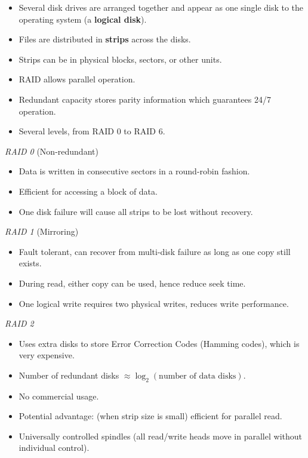 \begin{itemize}
    \item Several disk drives are arranged together and appear as one single disk to the operating
        system (a \textbf{logical disk}).
    \item Files are distributed in \textbf{strips} across the disks.
    \item Strips can be in physical blocks, sectors, or other units.
    \item RAID allows parallel operation.
    \item Redundant capacity stores parity information which guarantees 24/7 operation.
    \item Several levels, from RAID 0 to RAID 6.
\end{itemize}

\emph{RAID 0} {\normalfont\large (Non-redundant)}

\begin{itemize}
    \item Data is written in consecutive sectors in a round-robin fashion.
    \item Efficient for accessing a block of data.
    \item One disk failure will cause all strips to be lost without recovery.
\end{itemize}

\emph{RAID 1} {\normalfont\large (Mirroring)}

\begin{itemize}
    \item Fault tolerant, can recover from multi-disk failure as long as one copy still exists.
    \item During read, either copy can be used, hence reduce seek time.
    \item One logical write requires two physical writes, reduces write performance.
\end{itemize}

\emph{RAID 2}

\begin{itemize}
    \item Uses extra disks to store Error Correction Codes (Hamming codes), which is
        very expensive.
    \item Number of redundant disks $\approx \log_2 (\text{number of data disks})$.
    \item No commercial usage.
    \item Potential advantage: (when strip size is small) efficient for parallel read.
    \item Universally controlled spindles (all read/write heads move in parallel without
        individual control).
\end{itemize}


